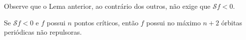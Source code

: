 Observe que o Lema anterior, ao contrário dos outros, não exige que $\mathcal{S} f < 0$.
%
%

%
%
%
%

\begin{theorem}[Singer]
Se $\mathcal{S} f < 0$ e $f$ possui $n$ pontos críticos, então $f$ possui no máximo $n+2$ órbitas periódicas não repulsoras.
\end{theorem}

